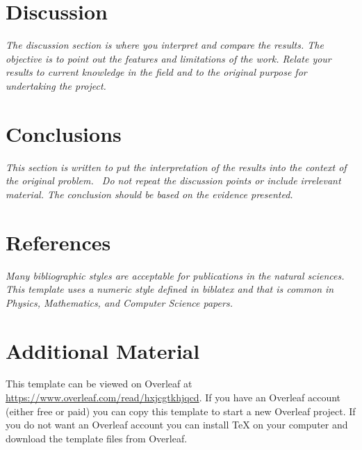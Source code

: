 \documentclass[11pt,a4paper,oneside]{report}
\newcommand{\instructions}[1]{{\color{black}\itshape #1}}
\begin{document}

\chapter{Discussion}
\label{discussion}

\instructions{The discussion section is where you interpret and compare the
results. The objective is to point out the features and limitations of
the work. Relate your results to current knowledge in the field and to
the original purpose for undertaking the project.}


\chapter{Conclusions}
\label{conclusions}

\instructions{This section is written to put the interpretation of the results
into the context of the original problem.~ Do not repeat the discussion
points or include irrelevant material. The conclusion should be based on
the evidence presented.}


\chapter*{References}
\label{references}


\instructions{Many bibliographic styles are acceptable for publications 
in the natural sciences. This template uses a numeric style defined in biblatex
and that is common in Physics, Mathematics, and Computer Science papers.}

\printbibliography[heading=none]



\appendix

\chapter{Additional Material}
\label{appendix-a}

This template can be viewed on Overleaf at \url{https://www.overleaf.com/read/hxjcgtkhjqcd}.
If you have an Overleaf account (either free or paid) you can copy this template to start a new Overleaf project.
If you do not want an Overleaf account you can install TeX on your computer and download the template files from Overleaf.
\end{document}
